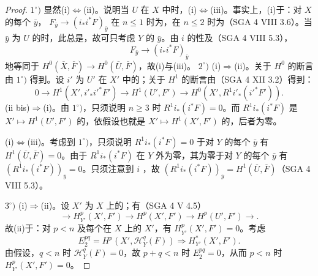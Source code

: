 \begin{proof}
$1^\circ)$ 显然(i)$\Leftrightarrow$(ii)。说明当 $U$ 在 $X$ 中时，(i)$\Leftrightarrow$(iii)。事实上，(i)于：对 $X$ 的每个 $\bar y$， $F_{\bar y}\to(i_*i^*F)_{\bar y}$ 在 $n\leq1$ 时为，在 $n\leq2$ 时为（SGA 4 VIII 3.6）。当 $\bar y$ 为 $U$ 的时，此总是，故可只考虑 $Y$ 的 $\bar y$。由 $i$ 的性及（SGA 4 VIII 5.3），
\[F_{\bar y}\longrightarrow(i_*i^*F)_{\bar y}\]
地等同于 $H^0(\overline X,\overline F)\to H^0(\overline U,\overline F)$，故(i)与(iii)。
$2^\circ)$ (i)$\Rightarrow$(ii)。关于 $H^0$ 的断言由 $1^\circ)$ 得到。设 $i'$ 为 $U'$ 在 $X'$ 中的；关于 $H^1$ 的断言由（SGA 4 XII 3.2）得到：
\[0\longrightarrow H^1(X',i'_*i'^*F')\longrightarrow H^1(U',F')\longrightarrow H^0(X',R^1i'_*(i'^*F')).\]
(ii bis)$\Rightarrow$(i)。由 $1^\circ)$，只须说明 $n\geq3$ 时 $R^1i_*(i^*F)=0$。而 $R^1i_*(i^*F)$ 是 $X'\mapsto H^1(U',F')$ 的，依假设也就是 $X'\mapsto H^1(X',F')$ 的，后者为零。

(i)$\Leftrightarrow$(iii)。考虑到 $1^\circ)$，只须说明 $R^1i_*(i^*F)=0$ 于对 $Y$ 的每个 $\bar y$ 有 $H^1(\overline U,\overline F)=0$。由于 $R^1i_*(i^*F)$ 在 $Y$ 外为零，其为零于对 $Y$ 的每个 $\bar y$ 有 $(R^1i_*(i^*F))_{\bar y}=0$。只须注意到 $i$ ，故 $(R^1i_*(i^*F))_{\bar y}=H^1(\overline U,\overline F)$（SGA 4 VIII 5.3）。

$3^\circ)$ (i)$\Rightarrow$(ii)。设 $X'$ 为 $X$ 上的；有（SGA 4 V 4.5）
\[\longrightarrow H^p_{Y'}(X',F')\longrightarrow H^p(X',F')\longrightarrow H^p(U',F')\longrightarrow.\tag{*}\]
故(ii)于：对 $p<n$ 及每个在 $X$ 上的 $X'$，有 $H^p_{Y'}(X',F')=0$。考虑
\[E_2^{pq}=H^p(X',\mathcal H_Y^q(F))\Longrightarrow H^*_{Y'}(X',F').\]
由假设，$q<n$ 时 $\mathcal H_Y^q(F)=0$，故 $p+q<n$ 时 $E_2^{pq}=0$，从而 $p<n$ 时 $H^p_{Y'}(X',F')=0$。


\end{proof}
